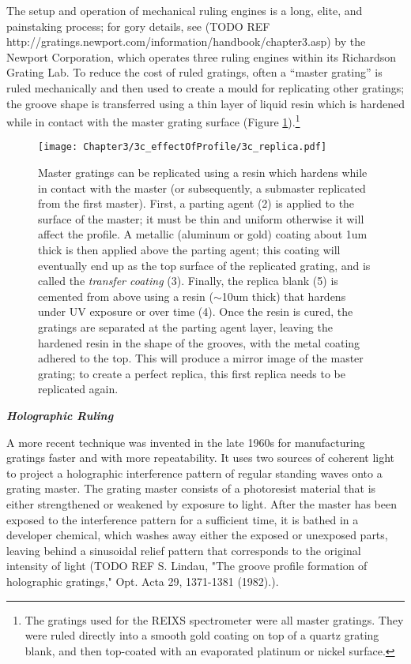 The setup and operation of mechanical ruling engines is a long, elite, and painstaking process; for gory details, see (TODO REF http://gratings.newport.com/information/handbook/chapter3.asp) by the Newport Corporation, which operates three ruling engines within its Richardson Grating Lab.  To reduce the cost of ruled gratings, often a ``master grating'' is ruled mechanically and then used to create a mould for replicating other gratings; the groove shape is transferred using a thin layer of liquid resin which is hardened while in contact with the master grating surface (Figure \ref{3c-replication}).\footnote{The gratings used for the REIXS spectrometer were all master gratings. They were ruled directly into a smooth gold coating on top of a quartz grating blank, and then top-coated with an evaporated platinum or nickel surface.}

\begin{figure}[htbp] %
   \centering
   \texttt{[image: Chapter3/3c\_effectOfProfile/3c\_replica.pdf]}
   \caption[Master gratings can be replicated using a resin which hardens while in contact with the master (or subsequently, a submaster replicated from the first master).]{Master gratings can be replicated using a resin which hardens while in contact with the master (or subsequently, a submaster replicated from the first master).  First, a parting agent (2) is applied to the surface of the master; it must be thin and uniform otherwise it will affect the profile.  A metallic (aluminum or gold) coating about 1um thick is then applied above the parting agent; this coating will eventually end up as the top surface of the replicated grating, and is called the \emph{transfer coating} (3).  Finally, the replica blank (5) is cemented from above using a resin ($\sim$10um thick) that hardens under UV exposure or over time (4).  Once the resin is cured, the gratings are separated at the parting agent layer, leaving the hardened resin in the shape of the grooves, with the metal coating adhered to the top.  This will produce a mirror image of the master grating; to create a perfect replica, this first replica needs to be replicated again.}
   \label{3c-replication}
\end{figure}

\noindent \textbf{\emph{Holographic Ruling}}

\noindent A more recent technique was invented in the late 1960s for manufacturing gratings faster and with more repeatability.  It uses two sources of coherent light to project a  holographic interference pattern of regular standing waves onto a grating master.  The grating master consists of a photoresist material that is either strengthened or weakened by exposure to light.  After the master has been exposed to the interference pattern for a sufficient time, it is bathed in a developer chemical, which washes away either the exposed or unexposed parts, leaving behind a sinusoidal relief pattern that corresponds to the original intensity of light (TODO REF  S. Lindau, "The groove profile formation of holographic gratings," Opt. Acta 29, 1371-1381 (1982).).


